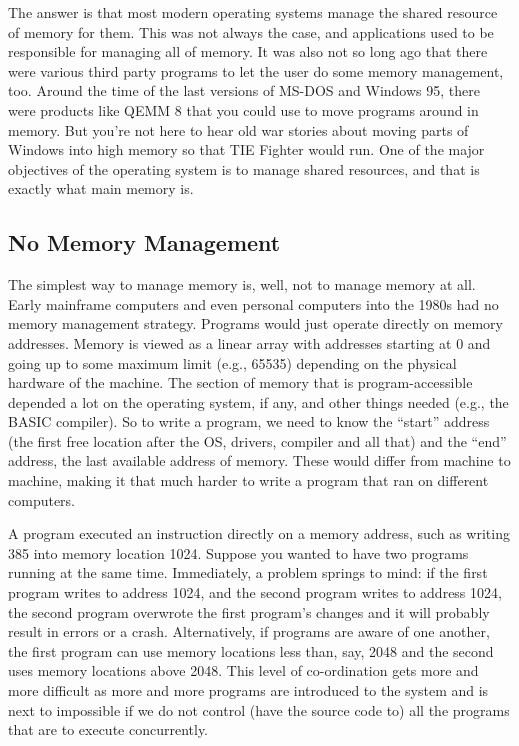 The answer is that most modern operating systems manage the shared resource of memory for them. This was not always the case, and applications used to be responsible for managing all of memory. It was also not so long ago that there were various third party programs to let the user do some memory management, too. Around the time of the last versions of MS-DOS and Windows 95, there were products like QEMM 8 that you could use to move programs around in memory. But you're not here to hear old war stories about moving parts of Windows into high memory so that TIE Fighter would run.  One of the major objectives of the operating system is to manage shared resources, and that is exactly what main memory is. 

\subsection*{No Memory Management}
The simplest way to manage memory is, well, not to manage memory at all. Early mainframe computers and even personal computers into the 1980s had no memory management strategy. Programs would just operate directly on memory addresses. Memory is viewed as a linear array with addresses starting at 0 and going up to some maximum limit (e.g., 65535) depending on the physical hardware of the machine. The section of memory that is program-accessible depended a lot on the operating system, if any, and other things needed (e.g., the BASIC compiler). So to write a program, we need to know the ``start'' address (the first free location after the OS, drivers, compiler and all that) and the ``end'' address, the last available address of memory. These would differ from machine to machine, making it that much harder to write a program that ran on different computers.

A program executed an instruction directly on a memory address, such as writing 385 into memory location 1024. Suppose you wanted to have two programs running at the same time. Immediately, a problem springs to mind: if the first program writes to address 1024, and the second program writes to address 1024, the second program overwrote the first program's changes and it will probably result in errors or a crash. Alternatively, if programs are aware of one another, the first program can use memory locations less than, say, 2048 and the second uses memory locations above 2048. This level of co-ordination gets more and more difficult as more and more programs are introduced to the system and is next to impossible if we do not control (have the source code to) all the programs that are to execute concurrently.

